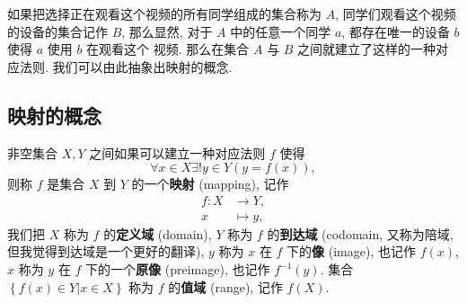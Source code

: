 \documentclass[10pt,UTF8]{book} %
\begin{document}
如果把选择正在观看这个视频的所有同学组成的集合称为 $A$, 同学们观看这个视频的设备的集合记作 $B$,
那么显然, 对于 $A$ 中的任意一个同学 $a$, 都存在唯一的设备 $b$ 使得 $a$ 使用 $b$ 在观看这个
视频. 那么在集合 $A$ 与 $B$ 之间就建立了这样的一种对应法则. 我们可以由此抽象出映射的概念.

\subsection{映射的概念}

\begin{definition}[映射]
    非空集合 $X, Y$ 之间如果可以建立一种对应法则 $f$ 使得
    \[ \forall x \in X \exists ! y \in Y \left( y = f(x) \right), \]
    则称 $f$ 是集合 $X$ 到 $Y$ 的一个\textbf{映射} (mapping), 记作
    \[ 
    \begin{aligned}
        f:X &\to Y, \\ 
        x &\mapsto y,
    \end{aligned} \]
    我们把 $X$ 称为 $f$ 的\textbf{定义域} (domain), $Y$ 称为 $f$ 的\textbf{到达域}
    (codomain, 又称为陪域, 但我觉得到达域是一个更好的翻译), $y$ 称为 $x$ 在 $f$
    下的\textbf{像} (image), 也记作 $f(x)$, $x$ 称为 $y$ 在 $f$ 下的一个\textbf{原像}
    (preimage), 也记作 $f^{-1}(y)$.
    集合 $\left\{ f(x) \in Y | x \in X \right\}$ 称为 $f$ 的\textbf{值域}
    (range), 记作 $f(X)$.
\end{definition}
\end{document}
